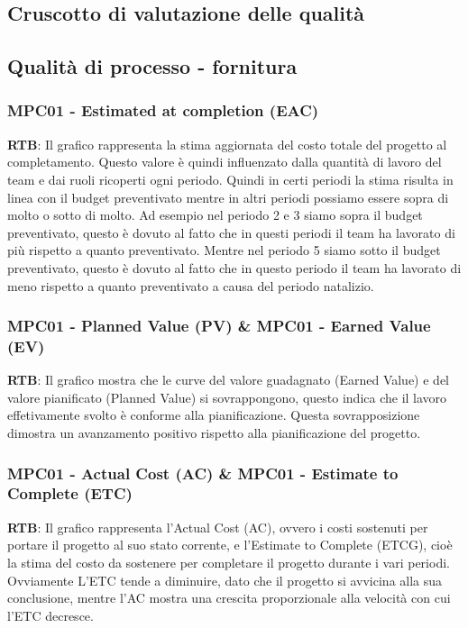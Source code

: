 \documentclass[10pt]{article}
\begin{document}
\begin{justify}
\section{Cruscotto di valutazione delle qualità}
\subsection{Qualità di processo - fornitura}
\subsubsection{MPC01 - Estimated at completion (EAC)}
\textbf{RTB}: Il grafico rappresenta la stima aggiornata del costo totale del progetto al completamento. Questo valore è quindi influenzato dalla quantità di lavoro del team e dai ruoli ricoperti ogni periodo. Quindi in certi periodi la stima risulta in linea con il budget preventivato mentre in altri periodi possiamo essere sopra di molto o sotto di molto. Ad esempio nel periodo 2 e 3 siamo sopra il budget preventivato, questo è dovuto al fatto che in questi periodi il team ha lavorato di più rispetto a quanto preventivato. Mentre nel periodo 5 siamo sotto il budget preventivato, questo è dovuto al fatto che in questo periodo il team ha lavorato di meno rispetto a quanto preventivato a causa del periodo natalizio.\\
\subsubsection{MPC01 - Planned Value (PV) \& MPC01 - Earned Value (EV)}
\textbf{RTB}: Il grafico mostra che le curve del valore guadagnato (Earned Value) e del valore pianificato (Planned Value) si sovrappongono, questo indica che il lavoro effetivamente svolto è conforme alla pianificazione. Questa sovrapposizione dimostra un avanzamento positivo rispetto alla pianificazione del progetto.
\subsubsection{MPC01 - Actual Cost (AC) \& MPC01 - Estimate to Complete (ETC)}
\textbf{RTB}: Il grafico rappresenta l'Actual Cost (AC), ovvero i costi sostenuti per portare il progetto al suo stato corrente, e l'Estimate to Complete (ETCG), cioè la stima del costo da sostenere per completare il progetto durante i vari periodi. \\
Ovviamente L'ETC tende a diminuire, dato che il progetto si avvicina alla sua conclusione, mentre l'AC mostra una crescita proporzionale alla velocità con cui l'ETC decresce.

\end{justify}
\end{document}
